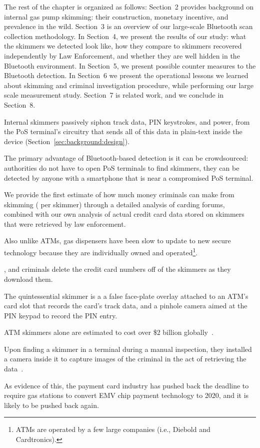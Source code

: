 The rest of the chapter is organized as follows: Section~2 provides background
on internal gas pump skimming: their construction, monetary incentive, and prevalence in
the wild. Section~3 is an overview of our large-scale Bluetooth scan collection methodology.
In Section~4, we
present the results of our study: what the skimmers we detected look like, how they compare to skimmers recovered independently by Law Enforcement, and
whether they are well hidden in the Bluetooth environment. In Section~5, we present
possible counter measures to the Bluetooth detection.  In Section~6 we present the operational lessons we
learned about skimming and criminal investigation procedure, while performing
our large scale measurement study. Section~7 is related work, and we conclude in
Section~8.


Internal skimmers passively siphon track data, PIN keystrokes, and power, from
the PoS terminal's circuitry that sends all of this data in plain-text inside
the device (Section~\ref{sec:background:design}).

%
The primary advantage of Bluetooth-based detection is it can be crowdsourced:
authorities do not have to open PoS terminals to find skimmers, they can be
detected by anyone with a smartphone that is near a compromised PoS terminal.
%

We provide the first estimate of how much money criminals can make from
skimming ( per skimmer) through a detailed analysis of carding
forums, combined with our own analysis of actual credit card data stored on
skimmers that were retrieved by law enforcement.
%


Also unlike ATMs, gas dispensers have been slow to update to new secure
technology because they are individually owned and operated\footnote{ATMs are
operated by a few large companies (i.e., Diebold and Cardtronics).}.

, and criminals delete the credit card numbers off of the skimmers as they
download them. 

The quintessential
skimmer is a a false face-plate overlay attached to an ATM's card slot that
records the card's track data, and a pinhole camera aimed at the PIN keypad to
record the PIN entry. 

ATM skimmers alone are estimated to cost over \$2 billion
globally~\cite{cnbc-skimmers}.

Upon finding a skimmer in a terminal during a manual inspection, they installed a
camera inside it to capture images of the criminal in the act of
retrieving the data~\cite{camera-in-pump}.

As evidence of this, the payment card industry has pushed back the deadline to
require gas stations to convert EMV chip payment technology to
2020, and it is likely to be pushed back again.



\fi %
